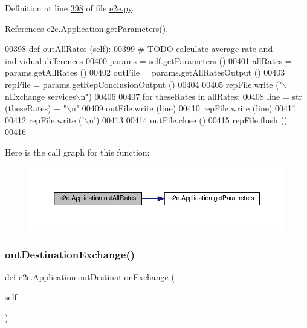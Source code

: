 Definition at line \hyperlink{e2e_8py_source_l00398}{398} of file \hyperlink{e2e_8py_source}{e2e.\+py}.



References \hyperlink{e2e_8py_source_l00386}{e2e.\+Application.\+get\+Parameters()}.


\begin{DoxyCode}
00398     \textcolor{keyword}{def }outAllRates (self):
00399         \textcolor{comment}{# TODO calculate average rate and individual differences}
00400         params = self.getParameters ()
00401         allRates = params.getAllRates ()
00402         outFile = params.getAllRatesOutput ()
00403         repFile = params.getRepConclusionOutput ()
00404         
00405         repFile.write (\textcolor{stringliteral}{"\(\backslash\)nExchange services\(\backslash\)n"}) 
00406         
00407         \textcolor{keywordflow}{for} theseRates \textcolor{keywordflow}{in} allRates:
00408             line = str (theseRates) + \textcolor{stringliteral}{"\(\backslash\)n"}
00409             outFile.write (line)
00410             repFile.write (line)
00411 
00412         repFile.write (\textcolor{stringliteral}{'\(\backslash\)n'})
00413         
00414         outFile.close ()
00415         repFile.flush ()
00416     
\end{DoxyCode}
Here is the call graph for this function\+:
\nopagebreak
\begin{figure}[H]
\begin{center}
\leavevmode
\includegraphics[width=350pt]{classe2e_1_1_application_acd7798aa633d75001b6f6fde556b8a51_cgraph}
\end{center}
\end{figure}
\mbox{\label{classe2e_1_1_application_a1b099bee6f8170c4c52e7ae884d95b27}} 
\subsubsection{\texorpdfstring{out\+Destination\+Exchange()}{outDestinationExchange()}}
{\footnotesize\ttfamily def e2e.\+Application.\+out\+Destination\+Exchange (\begin{DoxyParamCaption}\item[{}]{self }\end{DoxyParamCaption})}



